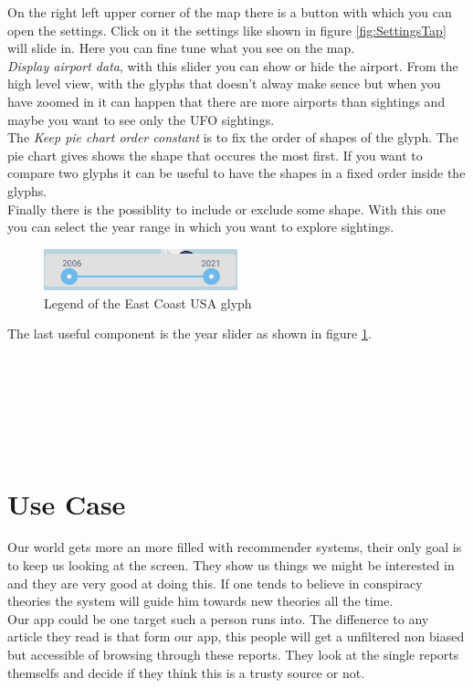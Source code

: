 \documentclass{article}
\begin{document}
On the right left upper corner of the map there is a button with which you can open the settings.
Click on it the settings like shown in figure \ref{fig:SettingsTap} will slide in. Here you can fine tune
what you see on the map. \\
\textit{Display airport data}, with this slider you can show or hide the airport. From the high level view,
with the glyphs that doesn't alway make sence but when you have zoomed in it can happen that there
are more airports than sightings and maybe you want to see only the UFO sightings.
\\
The \textit{Keep pie chart order constant} is to fix the order of shapes of the glyph. The pie chart gives
shows the shape that occures the most first. If you want to compare two glyphs it can be useful to have the
shapes in a fixed order inside the glyphs.
\\
Finally there is the possiblity to include or exclude some shape. With this one you can
select the year range in which you want to explore sightings. 
\\


\begin{figure} 
    \centering
    \includegraphics[width=0.5\textwidth]{yearSilder}
    \caption{Legend of the East Coast USA glyph}
    \label{fig:yearSilder}
\end{figure}

The last useful component is the year slider as shown in figure \ref{fig:yearSilder}. 
\\\\\\\\\\\\\\

\section*{Use Case}

Our world gets more an more filled with recommender systems, their only goal is to keep us looking at the screen. They show us things we might be interested in and they are very good at doing this. If one tends to believe in conspiracy theories the system will guide him towards new theories all the time.  \\
Our app could be one target such a person runs into. The diffenerce to any article they read is that form our app, this people will get a unfiltered non biased but accessible of browsing through these reports. They look at the single reports themselfs and decide if they think this is a trusty source or not. \\
\end{document}
